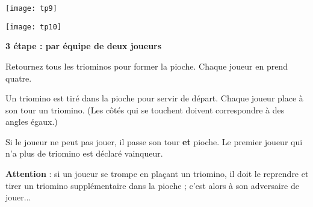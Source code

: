 \begin{TP}
\begin{enumerate}
\begin{center}
    \texttt{[image: tp9]}
    
    \texttt{[image: tp10]}
\end{center}

\vspace{1em}\textbf{3 étape : par équipe de deux joueurs}\vspace{1em}

Retournez tous les triominos pour former la pioche. Chaque joueur en prend quatre.      

Un triomino est tiré dans la pioche pour servir de départ. Chaque joueur place à son tour un triomino. (Les côtés qui se touchent doivent correspondre à des angles égaux.)

Si le joueur ne peut pas jouer, il passe son tour \textbf{et} pioche. Le premier joueur qui n'a plus de triomino est déclaré vainqueur.

\textbf{Attention} : si un joueur se trompe en plaçant un triomino, il doit le reprendre et tirer un triomino supplémentaire dans la pioche ; c'est alors à son adversaire de jouer...
\end{enumerate}

\end{TP}